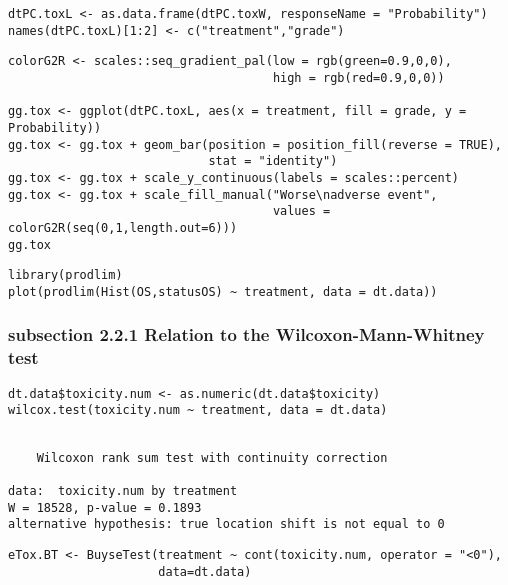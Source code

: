 \documentclass[12pt]{article}
\begin{document}
\lstset{language=r,label= ,caption= ,captionpos=b,numbers=none}
\begin{lstlisting}
dtPC.toxL <- as.data.frame(dtPC.toxW, responseName = "Probability")
names(dtPC.toxL)[1:2] <- c("treatment","grade")
\end{lstlisting}

\lstset{language=r,label= ,caption= ,captionpos=b,numbers=none}
\begin{lstlisting}
colorG2R <- scales::seq_gradient_pal(low = rgb(green=0.9,0,0),
                                     high = rgb(red=0.9,0,0))

gg.tox <- ggplot(dtPC.toxL, aes(x = treatment, fill = grade, y = Probability))
gg.tox <- gg.tox + geom_bar(position = position_fill(reverse = TRUE),
                            stat = "identity")
gg.tox <- gg.tox + scale_y_continuous(labels = scales::percent)
gg.tox <- gg.tox + scale_fill_manual("Worse\nadverse event",
                                     values = colorG2R(seq(0,1,length.out=6)))
gg.tox 
\end{lstlisting}

\lstset{language=r,label= ,caption= ,captionpos=b,numbers=none}
\begin{lstlisting}
library(prodlim)
plot(prodlim(Hist(OS,statusOS) ~ treatment, data = dt.data))
\end{lstlisting}

\subsubsection{subsection 2.2.1 Relation to the Wilcoxon-Mann-Whitney test}
\label{sec:orgea27541}

\lstset{language=r,label= ,caption= ,captionpos=b,numbers=none}
\begin{lstlisting}
dt.data$toxicity.num <- as.numeric(dt.data$toxicity)
wilcox.test(toxicity.num ~ treatment, data = dt.data)
\end{lstlisting}

\begin{verbatim}

	Wilcoxon rank sum test with continuity correction

data:  toxicity.num by treatment
W = 18528, p-value = 0.1893
alternative hypothesis: true location shift is not equal to 0
\end{verbatim}


\lstset{language=r,label= ,caption= ,captionpos=b,numbers=none}
\begin{lstlisting}
eTox.BT <- BuyseTest(treatment ~ cont(toxicity.num, operator = "<0"),
                     data=dt.data)
\end{lstlisting}
\end{document}
